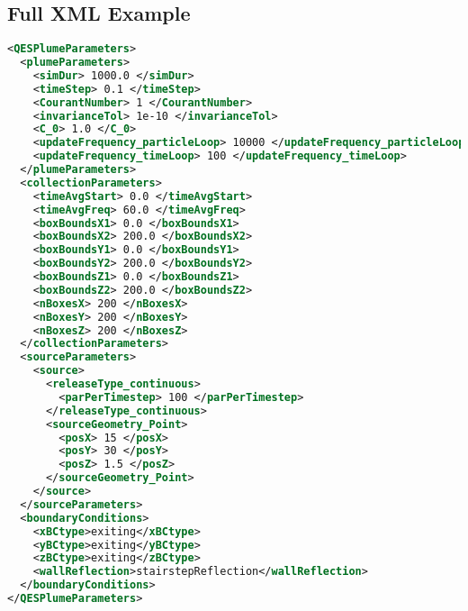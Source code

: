 \subsection{Full XML Example}
\begin{lstlisting}[language=XML]
<QESPlumeParameters>
  <plumeParameters>
    <simDur> 1000.0 </simDur>
    <timeStep> 0.1 </timeStep>
    <CourantNumber> 1 </CourantNumber>
    <invarianceTol> 1e-10 </invarianceTol>
    <C_0> 1.0 </C_0>
    <updateFrequency_particleLoop> 10000 </updateFrequency_particleLoop>
    <updateFrequency_timeLoop> 100 </updateFrequency_timeLoop>
  </plumeParameters>
  <collectionParameters>
    <timeAvgStart> 0.0 </timeAvgStart>
    <timeAvgFreq> 60.0 </timeAvgFreq>
    <boxBoundsX1> 0.0 </boxBoundsX1>
    <boxBoundsX2> 200.0 </boxBoundsX2>
    <boxBoundsY1> 0.0 </boxBoundsY1>
    <boxBoundsY2> 200.0 </boxBoundsY2>
    <boxBoundsZ1> 0.0 </boxBoundsZ1>
    <boxBoundsZ2> 200.0 </boxBoundsZ2>
    <nBoxesX> 200 </nBoxesX>
    <nBoxesY> 200 </nBoxesY>
    <nBoxesZ> 200 </nBoxesZ>
  </collectionParameters>
  <sourceParameters>
    <source>
      <releaseType_continuous>
	    <parPerTimestep> 100 </parPerTimestep>
      </releaseType_continuous>
      <sourceGeometry_Point>
        <posX> 15 </posX>
        <posY> 30 </posY>
        <posZ> 1.5 </posZ>
      </sourceGeometry_Point>
    </source>
  </sourceParameters>
  <boundaryConditions>
    <xBCtype>exiting</xBCtype>
    <yBCtype>exiting</yBCtype>
    <zBCtype>exiting</zBCtype>
    <wallReflection>stairstepReflection</wallReflection>
  </boundaryConditions>
</QESPlumeParameters>
\end{lstlisting}
